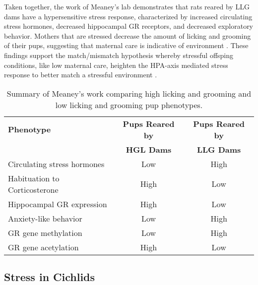 \documentclass[12pt,twoside]{reedthesis}
\begin{document}
Taken together, the work of Meaney's lab demonstrates that rats reared by LLG dams have a
hypersensitive stress response, characterized by increased circulating stress
hormones, decreased hippocampal GR receptors, and decreased exploratory
behavior.  Mothers that are stressed decrease
the amount of licking and grooming of their pups, suggesting that maternal care
is indicative of environment \citep{zhang_epigenetics_2010}.
These findings support the match/mismatch hypothesis whereby
stressful offsping conditions, like low maternal care, heighten the HPA-axis
mediated stress response to better match a stressful environment
\citep{meaney_early_1996, liu_maternal_2000}.
\begin{table}[htbp]
\caption[Summary of Meaney's work comparing high licking and grooming and low licking and grooming
pup phenotypes]{Summary of Meaney's work comparing high licking and grooming and low licking and grooming
pup phenotypes.}
\begin{center}
\footnotesize
\begin{tabular}{ | l | c | c | }
  \hline
  \textbf{Phenotype} & \textbf{Pups Reared by} & \textbf{Pups Reared by} \\
  & \textbf{HGL Dams} & \textbf{LLG Dams} \\
\hline
 Circulating stress hormones & Low & High\\
\hline
 Habituation to Corticosterone  & High & Low\\
\hline
  Hippocampal GR expression & High & Low\\
\hline
  Anxiety-like behavior & Low & High\\
\hline
  GR gene methylation & Low & High \\
\hline
  GR gene acetylation & High & Low \\
  \hline
\end{tabular}
\end{center}
\end{table}

\subsection{Stress in Cichlids}
\end{document}
